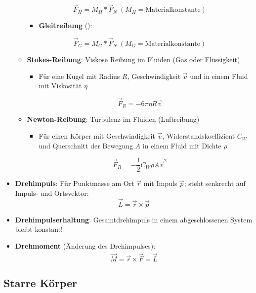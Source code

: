 \begin{itemize}
\begin{itemize}
\begin{equation}
			\vec{F}_H = M_H * \vec{F}_N\ (M_H = \text{Materialkonstante})
		\end{equation}
		\begin{itemize}
			\item \textbf{Gleitreibung} ():
		\end{itemize}
		\begin{equation}
			\vec{F}_G = M_G * \vec{F}_N\ (M_G = \text{Materialkonstante})
		\end{equation}
		\item \textbf{Stokes-Reibung}: Viskose Reibung im Fluiden (Gas oder Flüssigkeit)
		\begin{itemize}
			\item Für eine Kugel mit Radius $R$, Geschwindigkeit $\vec{v}$ und in einem Fluid mit Viskosität $\eta$
		\end{itemize}
		\begin{equation}
			\vec{F}_R = -6\pi\eta R\vec{v}
		\end{equation}
		\item \textbf{Newton-Reibung}: Turbulenz im Fluiden (Luftreibung)
		\begin{itemize}
			\item Für einen Körper mit Geschwindigkeit $\vec{v}$, Widerstandskoeffizient $C_W$ und Querschnitt der Bewegung $A$ in einem Fluid mit Dichte $\rho$
		\end{itemize}
		\begin{equation}
			\vec{F}_R = -\frac{1}{2}C_W\rho A \vec{v}^2
		\end{equation}
	\end{itemize}
	\item \textbf{Drehimpuls}: Für Punktmasse am Ort $\vec{r}$ mit Impuls $\vec{p}$; steht senkrecht auf Impuls- und Ortsvektor:
	\begin{equation}
		\vec{L} = \vec{r} \times \vec{p}
	\end{equation}
	\item \textbf{Drehimpulserhaltung}: Gesamtdrehimpuls in einem abgeschlossenen System bleibt konstant!
	\item \textbf{Drehmoment} (Änderung des Drehimpulses):
	\begin{equation}
		\vec{M} = \vec{r} \times \vec{F} = \dot{\vec{L}}
	\end{equation}
\end{itemize}

\subsection{Starre Körper}%
\label{mech:sub:starre_koerper}

